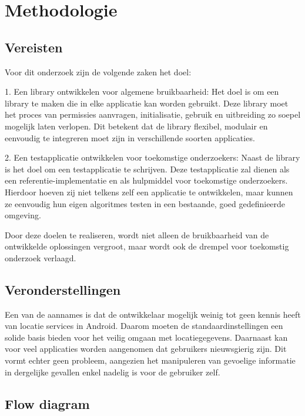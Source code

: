 \section*{Methodologie}
\subsection*{Vereisten}
Voor dit onderzoek zijn de volgende zaken het doel:

1. Een library ontwikkelen voor algemene bruikbaarheid: Het doel is om een library te maken die in elke applicatie kan worden gebruikt. Deze library moet het proces van permissies aanvragen, initialisatie, gebruik en uitbreiding zo soepel mogelijk laten verlopen. Dit betekent dat de library flexibel, modulair en eenvoudig te integreren moet zijn in verschillende soorten applicaties.

2. Een testapplicatie ontwikkelen voor toekomstige onderzoekers: Naast de library is het doel om een testapplicatie te schrijven. Deze testapplicatie zal dienen als een referentie-implementatie en als hulpmiddel voor toekomstige onderzoekers. Hierdoor hoeven zij niet telkens zelf een applicatie te ontwikkelen, maar kunnen ze eenvoudig hun eigen algoritmes testen in een bestaande, goed gedefinieerde omgeving.

Door deze doelen te realiseren, wordt niet alleen de bruikbaarheid van de ontwikkelde oplossingen vergroot, maar wordt ook de drempel voor toekomstig onderzoek verlaagd.
\subsection*{Veronderstellingen}
Een van de aannames is dat de ontwikkelaar mogelijk weinig tot geen kennis heeft van locatie services in Android. Daarom moeten de standaardinstellingen een solide basis bieden voor het veilig omgaan met locatiegegevens.  
Daarnaast kan voor veel applicaties worden aangenomen dat gebruikers nieuwsgierig zijn. Dit vormt echter geen probleem, aangezien het manipuleren van gevoelige informatie in dergelijke gevallen enkel nadelig is voor de gebruiker zelf.
\subsection*{Flow diagram}
